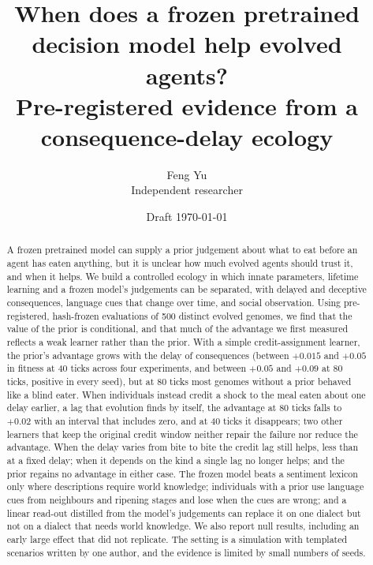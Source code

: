 \documentclass[11pt]{article}
\title{When does a frozen pretrained decision model help evolved agents?\\
\large Pre-registered evidence from a consequence-delay ecology}
\author{Feng Yu\\Independent researcher}
\date{Draft \today}
\begin{document}
\maketitle

\begin{abstract}
A frozen pretrained model can supply a prior judgement about what to eat before an agent has eaten anything, but it is unclear how much evolved agents should trust it, and when it helps. We build a controlled ecology in which innate parameters, lifetime learning and a frozen model's judgements can be separated, with delayed and deceptive consequences, language cues that change over time, and social observation. Using pre-registered, hash-frozen evaluations of 500 distinct evolved genomes, we find that the value of the prior is conditional, and that much of the advantage we first measured reflects a weak learner rather than the prior. With a simple credit-assignment learner, the prior's advantage grows with the delay of consequences (between $+0.015$ and $+0.05$ in fitness at 40 ticks across four experiments, and between $+0.05$ and $+0.09$ at 80 ticks, positive in every seed), but at 80 ticks most genomes without a prior behaved like a blind eater. When individuals instead credit a shock to the meal eaten about one delay earlier, a lag that evolution finds by itself, the advantage at 80 ticks falls to $+0.02$ with an interval that includes zero, and at 40 ticks it disappears; two other learners that keep the original credit window neither repair the failure nor reduce the advantage. When the delay varies from bite to bite the credit lag still helps, less than at a fixed delay; when it depends on the kind a single lag no longer helps; and the prior regains no advantage in either case. The frozen model beats a sentiment lexicon only where descriptions require world knowledge; individuals with a prior use language cues from neighbours and ripening stages and lose when the cues are wrong; and a linear read-out distilled from the model's judgements can replace it on one dialect but not on a dialect that needs world knowledge. We also report null results, including an early large effect that did not replicate. The setting is a simulation with templated scenarios written by one author, and the evidence is limited by small numbers of seeds.
\end{abstract}











\appendix

\end{document}
